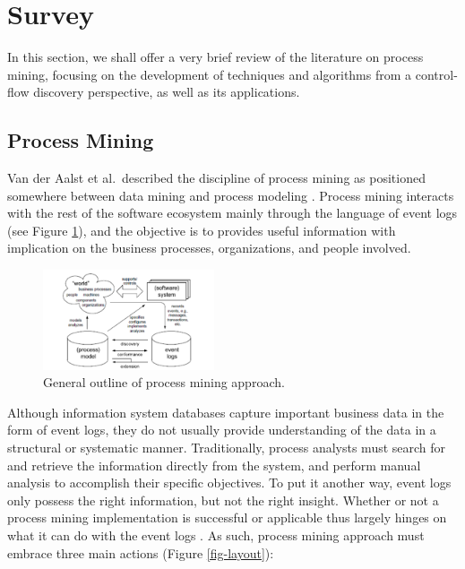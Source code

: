 \documentclass[conference]{IEEEtran}
\begin{document}
\section{Survey}
\label{section-survey}

In this section, we shall offer a very brief review of the literature
on process mining, focusing on the development of techniques
and algorithms from a control-flow discovery perspective, as well as
 its applications.

\subsection{Process Mining}

Van der Aalst et al.~described the discipline of process mining as positioned
somewhere between data mining and process modeling
\cite{van2004}. Process mining interacts with the rest of the software
ecosystem
mainly through the language of event logs (see Figure \ref{fig-outline}),
and the objective is to provides useful information
with implication on the business processes, organizations, and people involved.

\begin{figure}[htbp]
\centerline{\includegraphics[width=0.45\textwidth]{images/image2a.png}}
\caption{General outline of process mining approach.}
\label{fig-outline}
\end{figure}

Although information system databases capture important business data
in the form of event logs, they do not
usually provide understanding of the data in a structural or systematic manner.
Traditionally, process analysts must search for and
retrieve the information directly from the system, and perform manual
analysis to accomplish their specific objectives.
To put it another way, event logs only possess
the right information, but not the right insight.
Whether or not a process mining implementation is successful or applicable
thus largely hinges on what it can do with the event logs
\cite{van2012}. As such, process mining approach must
embrace three main actions (Figure \ref{fig-layout}):
\end{document}
